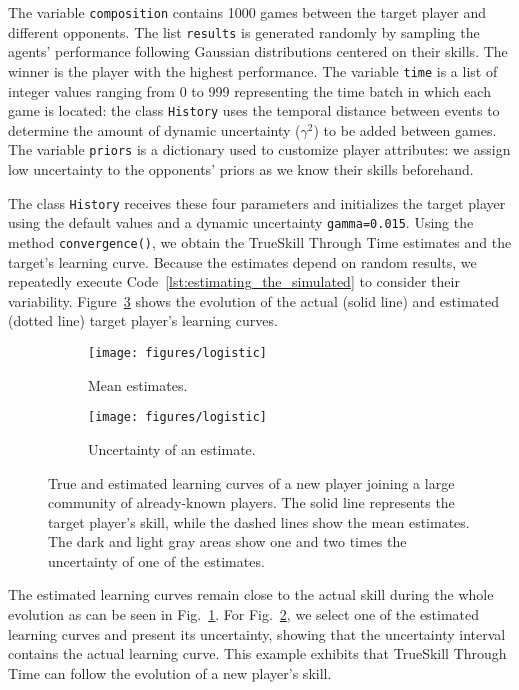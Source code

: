 \documentclass[article]{jss}
\begin{document}
The variable \texttt{composition} contains 1000 games between the target player and different opponents. 
The list \texttt{results} is generated randomly by sampling the agents' performance following Gaussian distributions centered on their skills. The winner is the player with the highest performance. 
The variable \texttt{time} is a list of integer values ranging from 0 to 999 representing the time batch in which each game is located: the class \texttt{History} uses the temporal distance between events to determine the amount of dynamic uncertainty ($\gamma^2$) to be added between games. 
The variable \texttt{priors} is a dictionary used to customize player attributes: we assign low uncertainty to the opponents' priors as we know their skills beforehand. 


The class \texttt{History} receives these four parameters and initializes the target player using the default values and a dynamic uncertainty \texttt{gamma=0.015}. 
Using the method \texttt{convergence()}, we obtain the TrueSkill Through Time estimates and the target's learning curve. 
Because the estimates depend on random results, we repeatedly execute Code~\ref{lst:estimating_the_simulated} to consider their variability. 
Figure~\ref{fig:logistic} shows the evolution of the actual (solid line) and estimated (dotted line) target player's learning curves. 
%
\begin{figure}[ht!]
    \centering
    \begin{subfigure}[b]{0.48\textwidth}
      \texttt{[image: figures/logistic]}
      \caption{Mean estimates.}
      \label{fig:logistic_mu}
    \end{subfigure}
    \begin{subfigure}[b]{0.48\textwidth}
      \texttt{[image: figures/logistic]}
      \caption{Uncertainty of an estimate.}
      \label{fig:logistic_sigma}
    \end{subfigure}
\caption{ True and estimated learning curves of a new player joining a large community of already-known players. The solid line represents the target player's skill, while the dashed lines show the mean estimates. The dark and light gray areas show one and two times the uncertainty of one of the estimates. }
    \label{fig:logistic}
\end{figure}
%
The estimated learning curves remain close to the actual skill during the whole evolution as can be seen in Fig.~\ref{fig:logistic_mu}. 
For Fig.~\ref{fig:logistic_sigma}, we select one of the estimated learning curves and present its uncertainty, showing that the uncertainty interval contains the actual learning curve. 
This example exhibits that TrueSkill Through Time can follow the evolution of a new player's skill. 
\end{document}
